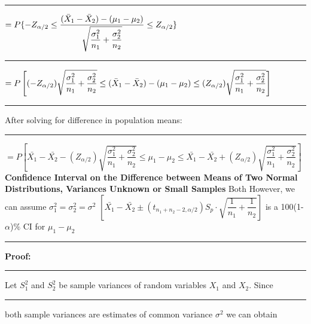 \documentclass[]{article}
\begin{document}
\newline
\newline\Large\rule{4.3cm}{0pt} $ = P \{ -Z_{\alpha\\/2} \le    \dfrac{  (  \bar{X}_1 - \bar{X}_2 )  -  (\mu_1 - \mu_2)   }{\sqrt{\dfrac{\sigma^2_1}{n_1} + \dfrac{\sigma^2_2}{n_2} }}    \le Z_{\alpha\\/2}  \}$
\newline
\newline
\newline\Large\rule{3.3cm}{0pt} $ = P \left[  (-Z_{\alpha\\/2} ) \sqrt{\dfrac{\sigma^2_1}{n_1} + \dfrac{\sigma^2_2}{n_2} }  \le  (  \bar{X}_1 - \bar{X}_2 )  -  (\mu_1 - \mu_2)  \le (Z_{\alpha\\/2}) \sqrt{\dfrac{\sigma^2_1}{n_1} + \dfrac{\sigma^2_2}{n_2} }  \right]$
\newline
\newline\Large\rule{3.3cm}{0pt} After solving for difference in population means:
\newline
\newline\Large\rule{2.3cm}{0pt} $ = P \left[   \bar{X_{1}} - \bar{X_{2}} - \left( Z_{\alpha / 2}  \right) \sqrt{\dfrac{\sigma^2_1}{n_1} + \dfrac{\sigma^2_2}{n_2}    }  \le  \mu_1 - \mu_2    \le   \bar{X_{1}} - \bar{X_{2}} + \left( Z_{\alpha / 2}  \right) \sqrt{\dfrac{\sigma^2_1}{n_1} + \dfrac{\sigma^2_2}{n_2}    }  \right]$
\newline
\newline
\Large\textbf{Confidence Interval on the Difference between Means of Two Normal Distributions, Variances Unknown or Small Samples}
\newline Both  However, we can assume $\sigma^2_1 = \sigma^2_2 =\sigma^2$
\newline
\newline
$\left[ \bar{X_{1}} - \bar{X_{2}} \pm \left( t_{n_{1}+ n_{2} -2 , \alpha / 2 }  \right) S_p \cdot  \sqrt{\dfrac{1}{n_1} + \dfrac{1}{n_2}    }      \right] $ is a 100(1-$\alpha$)$\%$ CI for $\mu_1 - \mu_2$ 
\newline 
\newline
\newline\Large\rule{3.0cm}{0pt} \textbf{Proof:}
\newline\Large\rule{3.0cm}{0pt} Let $S^2_1$ and $S^2_2$ be sample variances of random variables $X_1$ and $X_2$. Since 
\newline\Large\rule{3.0cm}{0pt} both sample variances are estimates of common variance $\sigma^2$ we can obtain
\end{document}
